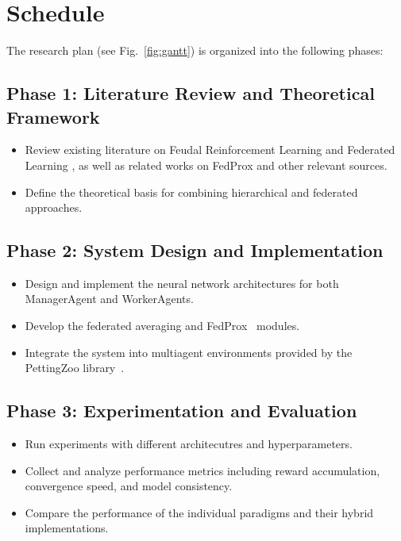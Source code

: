 \documentclass[12pt,a4paper,twoside,openany]{book}
\begin{document}
\section{Schedule}

The research plan (see Fig.~\ref{fig:gantt}) is organized into the following phases:

\subsection*{Phase 1: Literature Review and Theoretical Framework}
\begin{itemize}
    \item Review existing literature on Feudal Reinforcement Learning \cite{Vezhnevets2017} and Federated Learning \cite{McMahan2016}, as well as related works on FedProx \cite{Li2020} and other relevant sources.
    \item Define the theoretical basis for combining hierarchical and federated approaches.
\end{itemize}

\subsection*{Phase 2: System Design and Implementation}
\begin{itemize}
    \item Design and implement the neural network architectures for both ManagerAgent and WorkerAgents.
    \item Develop the federated averaging and FedProx~\cite{Li2020} modules.
    \item Integrate the system into multiagent environments provided by the PettingZoo library~\cite{PettingZoo}.
\end{itemize}

\subsection*{Phase 3: Experimentation and Evaluation}
\begin{itemize}
    \item Run experiments with different architecutres and hyperparameters.
    \item Collect and analyze performance metrics including reward accumulation, convergence speed, and model consistency.
    \item Compare the performance of the individual paradigms and their hybrid implementations.
\end{itemize}
\end{document}
